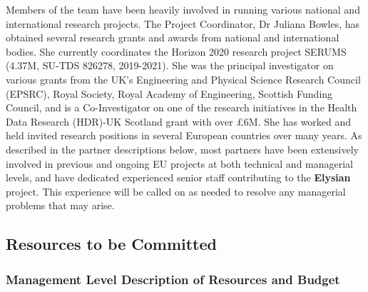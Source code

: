 \documentclass[a4paper,11pt]{article}
\newcommand{\project}[1]{\textbf{#1}\xspace}
\newcommand{\SECURITY}{\project{Elysian}}
\newcommand{\TheProject}{\SECURITY}
\begin{document}
Members of the team have been heavily involved in running
various national and international research projects.  The
Project Coordinator, Dr Juliana Bowles, has obtained several
research grants and awards from national and international
bodies. She currently coordinates the Horizon 2020 research project SERUMS (\euros 4.37M, SU-TDS 826278, 2019-2021).
She was the principal investigator on various grants from the UK's Engineering and Physical Science Research Council (EPSRC), Royal Society, Royal Academy of Engineering, Scottish Funding Council, and is a Co-Investigator on one of the research initiatives in the Health Data Research (HDR)-UK Scotland grant with over \pounds 6M. She has worked and held invited  research positions in several European countries over many years. 
As described in the partner descriptions below,
most partners have been extensively involved in previous and
ongoing EU projects at both technical and managerial
levels, and have dedicated experienced senior staff contributing to the \TheProject{} project.
%
This experience will be called on as needed to resolve any
managerial problems that may arise. %


\subsection{Resources to be Committed}




\subsubsection{Management Level Description of Resources and Budget}
\vspace{-6pt}

\end{document}
